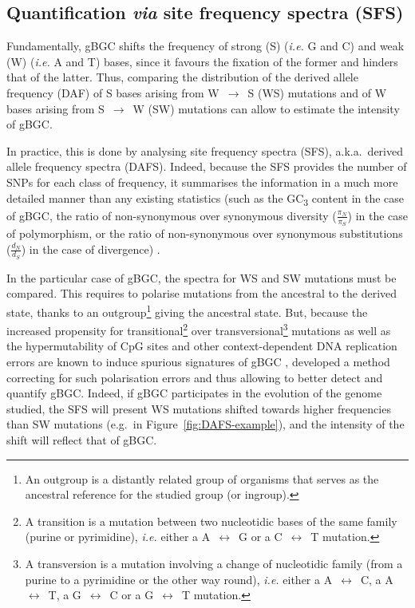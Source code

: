 \subsection{Quantification \textit{via} site frequency spectra (SFS)}

Fundamentally, gBGC shifts the frequency of strong (S) (\textit{i.e.} G and C) and weak (W) (\textit{i.e.} A and T) bases, since it favours the fixation of the former and hinders that of the latter.
Thus, comparing the distribution of the derived allele frequency (DAF) of S bases arising from W~$\rightarrow$~S (WS) mutations and of W bases arising from S~$\rightarrow$~W (SW) mutations can allow to estimate the intensity of gBGC\@.

In practice, this is done by analysing site frequency spectra (SFS), a.k.a.\ derived allele frequency spectra (DAFS).
Indeed, because the SFS provides the number of SNPs for each class of frequency, it summarises the information in a much more detailed manner than any existing statistics (such as the GC\textsubscript{3} content in the case of gBGC, the ratio of non-synonymous over synonymous diversity ($\frac{\pi_N}{\pi_S}$) in the case of polymorphism, or the ratio of non-synonymous over synonymous substitutions ($\frac{d_N}{d_S}$) in the case of divergence) \citep{rousselle2018estimation}.

In the particular case of gBGC, the spectra for WS and SW mutations must be compared.
This requires to polarise mutations from the ancestral to the derived state, thanks to an outgroup\footnote{An outgroup is a distantly related group of organisms that serves as the ancestral reference for the studied group (or ingroup).} giving the ancestral state.
But, because the increased propensity for transitional\footnote{A transition is a mutation between two nucleotidic bases of the same family (purine or pyrimidine), \textit{i.e.} either a A~$\leftrightarrow$~G or a C~$\leftrightarrow$~T mutation.} over transversional\footnote{A transversion is a mutation involving a change of nucleotidic family (from a purine to a pyrimidine or the other way round), \textit{i.e.} either a A~$\leftrightarrow$~C, a A~$\leftrightarrow$~T, a G~$\leftrightarrow$~C or a G~$\leftrightarrow$~T mutation.} mutations as well as the hypermutability of CpG sites and other context-dependent DNA replication errors \citep{hwang2004bayesian} are known to induce spurious signatures of gBGC \citep{hernandez2007contextdependent}, \citet{glemin2015quantification} developed a method correcting for such polarisation errors and thus allowing to better detect and quantify gBGC\@.
Indeed, if gBGC participates in the evolution of the genome studied, the SFS will present WS mutations shifted towards higher frequencies than SW mutations (e.g.\ in Figure~\ref{fig:DAFS-example}), and the intensity of the shift will reflect that of gBGC.\\


